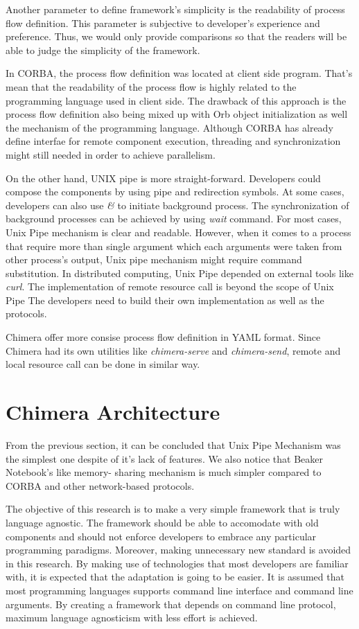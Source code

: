 \documentclass[conference]{IEEEtran}
\begin{document}
Another parameter to define framework's simplicity is the readability of process flow definition.
This parameter is subjective to developer's experience and preference. Thus, we would only provide 
comparisons so that the readers will be able to judge the simplicity of the framework.  

In CORBA, the process flow definition was located at client side program. That's mean that the
readability of the process flow is highly related to the programming language used in client side.
The drawback of this approach is the process flow definition also being mixed up with Orb object 
initialization as well the mechanism of the programming language. Although CORBA has already define
interfae for remote component execution, threading and synchronization might still needed in order to
achieve parallelism.

On the other hand, UNIX pipe is more straight-forward. Developers could compose the components by using
pipe and redirection symbols. At some cases, developers can also use {\it &} to initiate background process.
The synchronization of background processes can be achieved by using {\it wait} command. For most cases,
Unix Pipe mechanism is clear and readable. However, when it comes to a process that require more than 
single argument which each arguments were taken from other process's output, Unix pipe mechanism might 
require command substitution. In distributed computing, Unix Pipe depended on external tools like 
{\it curl}. The implementation of remote resource call is beyond the scope of Unix Pipe The developers
need to build their own implementation as well as the protocols.

Chimera offer more consise process flow definition in YAML format. Since Chimera had its own utilities
like {\it chimera-serve} and {\it chimera-send}, remote and local resource call can be done in similar way.

\section{Chimera Architecture}

From the previous section, it can be concluded that Unix Pipe Mechanism was the simplest one
despite of it's lack of features. We also notice that Beaker Notebook's like memory-
sharing mechanism is much simpler compared to CORBA and other network-based protocols.

The objective of this research is to make a very simple framework that is truly language agnostic. The framework
should be able to accomodate with old components and should not enforce developers to embrace any 
particular programming paradigms. Moreover, making unnecessary new standard is avoided in this research.
By making use of technologies that most developers are familiar with, it is expected that the adaptation is
going to be easier. It is assumed that most programming languages supports command line interface and
command line arguments. By creating a framework that depends on command line protocol,
maximum language agnosticism with less effort is achieved.
\end{document}
